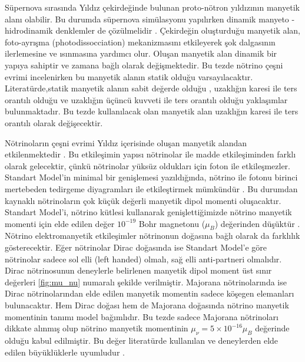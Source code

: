 Süpernova sırasında Yıldız çekirdeğinde bulunan proto-nötron yıldızının manyetik alanı olabilir. Bu durumda süpernova simülasyonu yapılırken dinamik manyeto -hidrodinamik denklemler de çözülmelidir \cite{1970ApJ...161..541L, 2011ApJ...743...30T, Burrows:2012ew}. Çekirdeğin oluşturduğu manyetik alan, foto-ayrışma (photodissocciation) mekanizmasını etkileyerek şok dalgasının ilerlemesine ve ısınmasına yardımcı olur. Oluşan manyetik alan dinamik bir yapıya sahiptir ve zamana bağlı olarak değişmektedir. Bu tezde nötrino çeşni evrimi incelenirken bu manyetik alanın statik olduğu varsayılacaktır. Literatürde,statik manyetik alanın sabit değerde olduğu \cite{Abbar:2020ggq}, uzaklığın karesi ile ters orantılı olduğu \cite{Kharlanov:2020cti,deGouvea:2012hg, deGouvea:2013zp} ve uzaklığın üçüncü kuvveti ile ters orantılı \cite{Sasaki:2021bvu} olduğu yaklaşımlar bulunmaktadır. Bu tezde kullanılacak olan manyetik alan uzaklığın karesi ile ters orantılı olarak değişecektir.

Nötrinoların çeşni evrimi Yıldız içerisinde oluşan manyetik alandan etkilenmektedir \cite{Giunti:2014ixa}. Bu etkileşimin yapısı nötrinolar ile madde etkileşiminden farklı olarak gelecektir, çünkü nötrinolar yüksüz oldukları için foton ile etkileşmezler. Standart Model'in minimal bir genişlemesi yazıldığında, nötrino ile fotonu birinci mertebeden tedirgeme diyagramları ile etkileştirmek mümkündür \cite{Pal:1981rm}. Bu durumdan kaynaklı nötrinoların çok küçük değerli manyetik dipol momenti oluşacaktır. Standart Model'i, nötrino kütlesi kullanarak genişlettiğimizde nötrino manyetik momenti için elde edilen değer $ 10^{-19} $ Bohr magnetonu ($ \mu_{B} $) değerinden düşüktür \cite{Marciano:1977wx, Shrock:1982sc, Raffelt:1996wa, Bell:2005kz, Bell:2006wi}. Nötrino elektromanyetik etkileşimler nötrinonun doğasına bağlı olarak da farklılık gösterecektir. Eğer nötrinolar Dirac doğasında ise Standart Model'e göre nötrinolar sadece sol elli (left handed) olmalı, sağ elli anti-partneri olmalıdır. Dirac nötrinosunun deneylerle belirlenen manyetik dipol moment üst sınır değerleri \ref{fig:mu_nu} numaralı şekilde verilmiştir. Majorana nötrinolarında ise Dirac nötrinolarından elde edilen manyetik momentin sadece köşegen elemanları bulunacaktır. Hem Dirac doğası hem de Majorana doğasında nötrino manyetik momentinin tanımı model bağımlıdır. Bu tezde sadece Majorana nötrinoları dikkate alınmış olup nötrino manyetik momentinin $ \mu_{\nu}=5\times10^{-16} \mu_{B}$ değerinde olduğu kabul edilmiştir. Bu değer literatürde kullanılan ve deneylerden elde edilen büyüklüklerle uyumludur \cite{Bell:2006wi, Kuroda:2020pta, Super-Kamiokande:2020frs, Borexino:2017fbd, Brdar:2020quo}.


